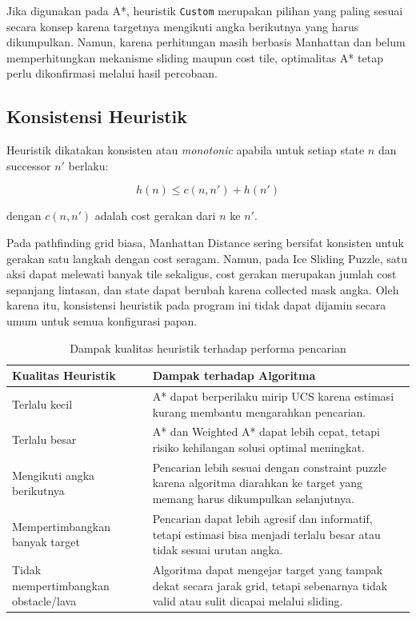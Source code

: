 Jika digunakan pada A*, heuristik \texttt{Custom} merupakan pilihan yang paling sesuai secara konsep karena targetnya mengikuti angka berikutnya yang harus dikumpulkan. 
Namun, karena perhitungan masih berbasis Manhattan dan belum memperhitungkan mekanisme sliding maupun cost tile, optimalitas A* tetap perlu dikonfirmasi melalui hasil percobaan.

\subsection{Konsistensi Heuristik}

Heuristik dikatakan konsisten atau \textit{monotonic} apabila untuk setiap state $n$ dan successor $n'$ berlaku:

\[
	h(n) \leq c(n,n') + h(n')
\]

dengan $c(n,n')$ adalah cost gerakan dari $n$ ke $n'$.

\begin{tcolorbox}[
	colback=green!5,
	colframe=green!50!black,
	title=\textbf{Analisis Konsistensi},
	arc=2mm,
	boxrule=0.8pt
]
Pada pathfinding grid biasa, Manhattan Distance sering bersifat konsisten untuk gerakan satu langkah dengan cost seragam. 
Namun, pada Ice Sliding Puzzle, satu aksi dapat melewati banyak tile sekaligus, cost gerakan merupakan jumlah cost sepanjang lintasan, dan state dapat berubah karena collected mask angka. 
Oleh karena itu, konsistensi heuristik pada program ini tidak dapat dijamin secara umum untuk semua konfigurasi papan.
\end{tcolorbox}

\begin{table}[H]
	\centering
	\caption{Dampak kualitas heuristik terhadap performa pencarian}
	\begin{tabular}{|p{4cm}|p{10cm}|}
		\hline
		\rowcolor{orange!20}
		\textbf{Kualitas Heuristik} & \textbf{Dampak terhadap Algoritma} \\
		\hline
		Terlalu kecil & A* dapat berperilaku mirip UCS karena estimasi kurang membantu mengarahkan pencarian. \\
		\hline
		Terlalu besar & A* dan Weighted A* dapat lebih cepat, tetapi risiko kehilangan solusi optimal meningkat. \\
		\hline
		Mengikuti angka berikutnya & Pencarian lebih sesuai dengan constraint puzzle karena algoritma diarahkan ke target yang memang harus dikumpulkan selanjutnya. \\
		\hline
		Mempertimbangkan banyak target & Pencarian dapat lebih agresif dan informatif, tetapi estimasi bisa menjadi terlalu besar atau tidak sesuai urutan angka. \\
		\hline
		Tidak mempertimbangkan obstacle/lava & Algoritma dapat mengejar target yang tampak dekat secara jarak grid, tetapi sebenarnya tidak valid atau sulit dicapai melalui sliding. \\
		\hline
	\end{tabular}
\end{table}

